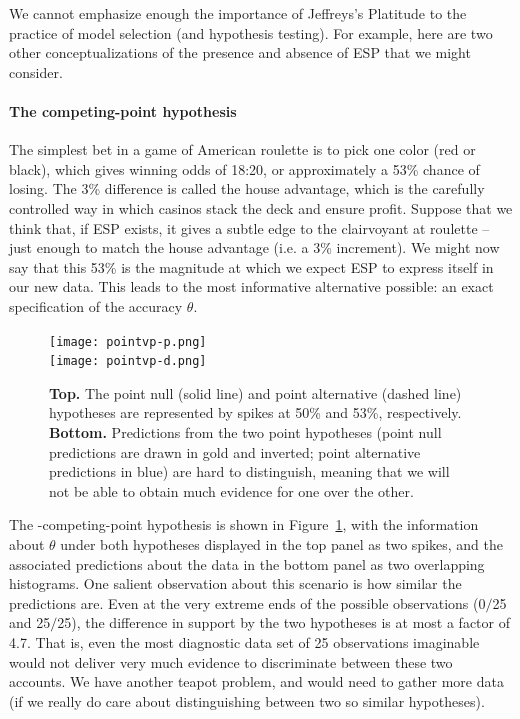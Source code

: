 We cannot emphasize enough the importance of Jeffreys's Platitude to the practice of model selection (and hypothesis testing).  For example, here are two other conceptualizations of the presence and absence of ESP that we might consider.

\paragraph{The competing-point hypothesis} 
The simplest bet in a game of American roulette is to pick one color (red or black), which gives winning odds of 18:20, or approximately a 53\% chance of losing.  The 3\% difference is called the house advantage, which is the carefully controlled way in which casinos stack the deck and ensure profit. Suppose that we think that, if ESP exists, it gives a subtle edge to the clairvoyant at roulette -- just enough to match the house advantage (i.e. a 3\% increment). We might now say that this 53\% is the magnitude at which we expect ESP to express itself in our new data. This leads to the most informative alternative possible: an exact specification of the accuracy $\theta$. 

\begin{figure}[tb]
\texttt{[image: pointvp-p.png]}\\
\texttt{[image: pointvp-d.png]}
\caption{\textbf{Top.} The point null (solid line) and point alternative (dashed line) hypotheses are represented by spikes at 50\% and 53\%, respectively. \textbf{Bottom.} Predictions from the two point hypotheses (point null predictions are drawn in gold and inverted; point alternative predictions in blue) are hard to distinguish, meaning that we will not be able to obtain much evidence for one over the other.}\label{fig:v}
\end{figure}

The \hyp{competing-point hypothesis} is shown in Figure~\ref{fig:v}, with the information about $\theta$ under both hypotheses displayed in the top panel as two spikes, and the associated predictions about the data in the bottom panel as two overlapping histograms.  One salient observation about this scenario is how similar the predictions are.  Even at the very extreme ends of the possible observations (0$/$25 and 25$/$25), the difference in support by the two hypotheses is at most a factor of 4.7.  That is, even the most diagnostic data set of 25 observations imaginable would not deliver very much evidence to discriminate between these two accounts. We have another teapot problem, and would need to gather more data (if we really do care about distinguishing between two so similar hypotheses).

